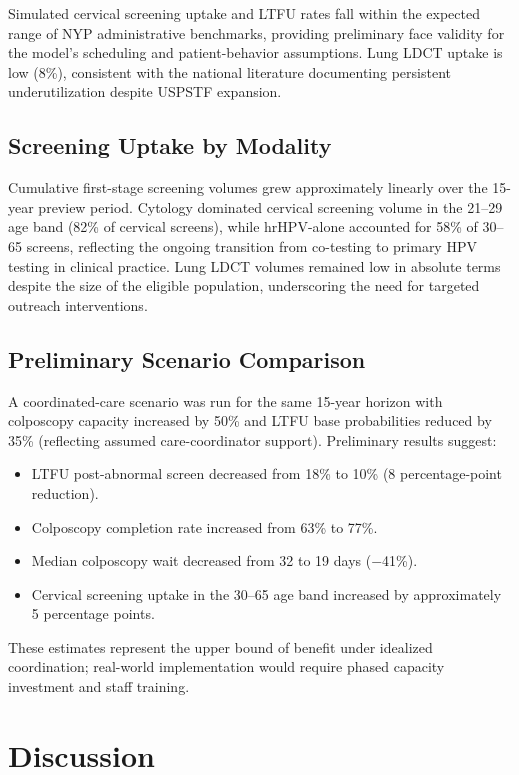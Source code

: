 \documentclass[12pt]{article}
\begin{document}
Simulated cervical screening uptake and LTFU rates fall within the
expected range of NYP administrative benchmarks, providing preliminary
face validity for the model's scheduling and patient-behavior assumptions.
Lung LDCT uptake is low (8\%), consistent with the national literature
documenting persistent underutilization despite USPSTF expansion.

\subsection{Screening Uptake by Modality}

Cumulative first-stage screening volumes grew approximately linearly over
the 15-year preview period.
Cytology dominated cervical screening volume in the 21--29 age band
(82\% of cervical screens), while hrHPV-alone accounted for 58\% of
30--65 screens, reflecting the ongoing transition from co-testing to
primary HPV testing in clinical practice.
Lung LDCT volumes remained low in absolute terms despite the size of the
eligible population, underscoring the need for targeted outreach
interventions.

\subsection{Preliminary Scenario Comparison}

A coordinated-care scenario was run for the same 15-year horizon with
colposcopy capacity increased by 50\% and LTFU base probabilities
reduced by 35\% (reflecting assumed care-coordinator support).
Preliminary results suggest:
\begin{itemize}[leftmargin=2em]
  \item LTFU post-abnormal screen decreased from 18\% to 10\%
        (8 percentage-point reduction).
  \item Colposcopy completion rate increased from 63\% to 77\%.
  \item Median colposcopy wait decreased from 32 to 19 days ($-$41\%).
  \item Cervical screening uptake in the 30--65 age band increased by
        approximately 5 percentage points.
\end{itemize}
These estimates represent the upper bound of benefit under idealized
coordination; real-world implementation would require phased capacity
investment and staff training.

\section{Discussion}
\end{document}
